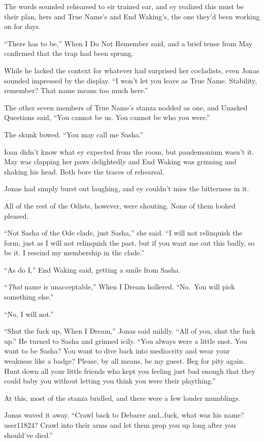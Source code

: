 The words sounded rehearsed to eir trained ear, and ey realized this must be their plan, hers and True Name's and End Waking's, the one they'd been working on for days.

``There has to be,'' When I Do Not Remember said, and a brief tense from May confirmed that the trap had been sprung.

While he lacked the context for whatever had surprised her cocladists, even Jonas sounded impressed by the display. ``I won't let you leave as True Name. Stability, remember? That name means too much here.''

The other seven members of True Name's stanza nodded as one, and Unasked Questions said, ``You cannot be us. You cannot be who you were.''

The skunk bowed. ``You may call me Sasha.''

Ioan didn't know what ey expected from the room, but pandemonium wasn't it. May was clapping her paws delightedly and End Waking was grinning and shaking his head. Both bore the traces of rehearsal.

Jonas had simply burst out laughing, and ey couldn't miss the bitterness in it.

All of the rest of the Odists, however, were shouting. None of them looked pleased.

``Not Sasha of the Ode clade, just Sasha,'' she said. ``I will not relinquish the form, just as I will not relinquish the past, but if you want me out this badly, so be it. I rescind my membership in the clade.''

``As do I,'' End Waking said, getting a smile from Sasha.

``\emph{That} name is unacceptable,'' When I Dream hollered. ``No.~You will pick something else.''

``No, I will not.''

``Shut the fuck up, When I Dream,'' Jonas said mildly. ``All of you, shut the fuck up.'' He turned to Sasha and grinned icily. ``You always were a little snot. You want to be Sasha? You want to dive back into mediocrity and wear your weakness like a badge? Please, by all means, be my guest. Beg for pity again. Hunt down all your little friends who kept you feeling just bad enough that they could baby you without letting you think you were their plaything.''

At this, most of the stanza bridled, and there were a few louder mumblings.

Jonas waved it away. ``Crawl back to Debarre and\ldots fuck, what was his name? user11824? Crawl into their arms and let them prop you up long after you should've died.''

